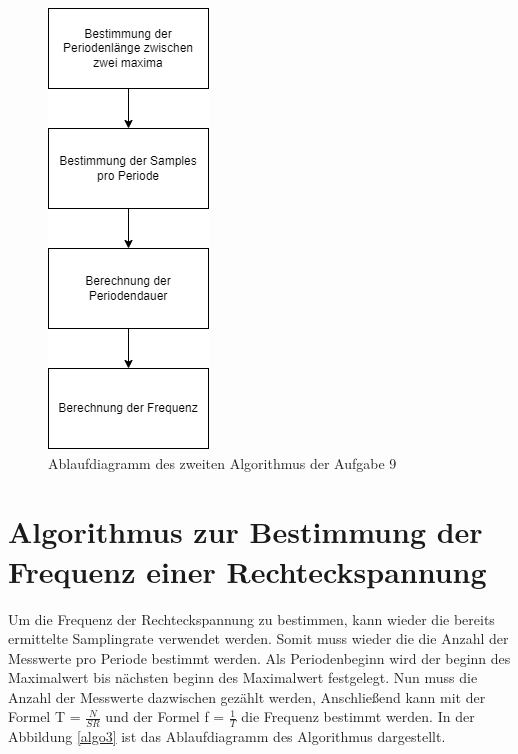 \begin{figure}
	\centering
	\includegraphics[scale=0.5]{Images/aufgabe9_algo2.png}
	\caption{Ablaufdiagramm des zweiten Algorithmus der Aufgabe 9}
	\label{algo2}
\end{figure}

\section{Algorithmus zur Bestimmung der Frequenz einer Rechteckspannung}
Um die Frequenz der Rechteckspannung zu bestimmen, kann wieder die bereits ermittelte Samplingrate verwendet werden. 
Somit muss wieder die die Anzahl der Messwerte pro Periode bestimmt werden.
Als Periodenbeginn wird der beginn des Maximalwert bis nächsten beginn des Maximalwert festgelegt.
Nun muss die Anzahl der Messwerte dazwischen gezählt werden,
Anschließend kann mit der Formel T = $\frac{N}{SR}$ und der Formel f = $\frac{1}{T}$ die Frequenz bestimmt werden.
In der Abbildung \ref{algo3} ist das Ablaufdiagramm des Algorithmus dargestellt.\par

